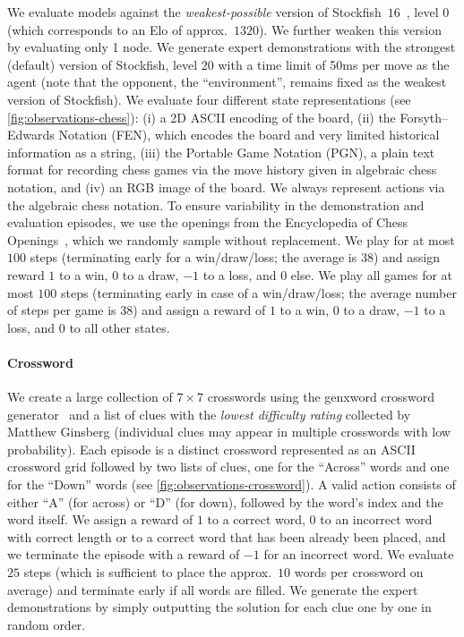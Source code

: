 We evaluate models against the \emph{weakest-possible} version of Stockfish~$16$~\citep{romstad2008stockfish}, \ie level $0$ (which corresponds to an Elo of approx.\ $1320$).
We further weaken this version by evaluating only 1 node.
We generate expert demonstrations with the strongest (default) version of Stockfish, \ie level $20$ with a time limit of 50ms per move as the agent (note that the opponent, \ie the ``environment'', remains fixed as the weakest version of Stockfish).
We evaluate four different state representations (see \cref{fig:observations-chess}): (i) a 2D ASCII encoding of the board, (ii) the Forsyth–Edwards Notation (FEN), which encodes the board and very limited historical information as a string, (iii) the Portable Game Notation (PGN), a plain text format for recording chess games via the move history given in algebraic chess notation, and (iv) an RGB image of the board.
We always represent actions via the algebraic chess notation.
To ensure variability in the demonstration and evaluation episodes, we use the openings from the Encyclopedia of Chess Openings~\citep{matanovic1978encyclopaedia}, which we randomly sample without replacement.
\ificlr
We play for at most $100$ steps (terminating early for a win/draw/loss; the average is $38$) and assign reward $1$ to a win, $0$ to a draw, $-1$ to a loss, and $0$ else.
\else
We play all games for at most $100$ steps (terminating early in case of a win/draw/loss; the average number of steps per game is $38$) and assign a reward of $1$ to a win, $0$ to a draw, $-1$ to a loss, and $0$ to all other states.
\fi

\paragraph{Crossword}

We create a large collection of $7\times7$ crosswords using the genxword crossword generator~\citep{whitlock2011genxword} and a list of  clues with the \emph{lowest difficulty rating} collected by Matthew Ginsberg (individual clues may appear in multiple crosswords with low probability).
Each episode is a distinct crossword represented as an ASCII crossword grid followed by two lists of clues, one for the ``Across'' words and one for the ``Down'' words (see \cref{fig:observations-crossword}).
A valid action consists of either ``A'' (for across) or ``D'' (for down), followed by the word's index and the word itself.
We assign a reward of $1$ to a correct word, $0$ to an incorrect word with correct length or to a correct word that has been already been placed, and we terminate the episode with a reward of $-1$ for an incorrect word.
We evaluate $25$ steps (which is sufficient to place the approx.\ $10$ words per crossword on average) and terminate early if all words are filled.
We generate the expert demonstrations by simply outputting the solution for each clue one by one in random order.

